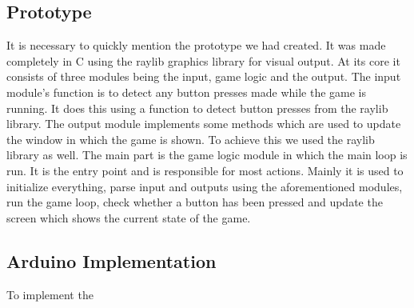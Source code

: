 \documentclass[12pt, a4paper]{article}
\begin{document}
\subsection*{Prototype}

It is necessary to quickly mention the prototype we had created. It was made completely in C using the raylib graphics library for visual output. At its core it consists of three modules being the input, game logic and the output. The input module's function is to detect any button presses made while the game is running. It does this using a function to detect button presses from the raylib library. The output module implements some methods which are used to update the window in which the game is shown. To achieve this we used the raylib library as well. The main part is the game logic module in which the main loop is run. It is the entry point and is responsible for most actions. Mainly it is used to initialize everything, parse input and outputs using the aforementioned modules, run the game loop, check whether a button has been pressed and update the screen which shows the current state of the game.

\subsection*{Arduino Implementation}
To implement the 
\end{document}
